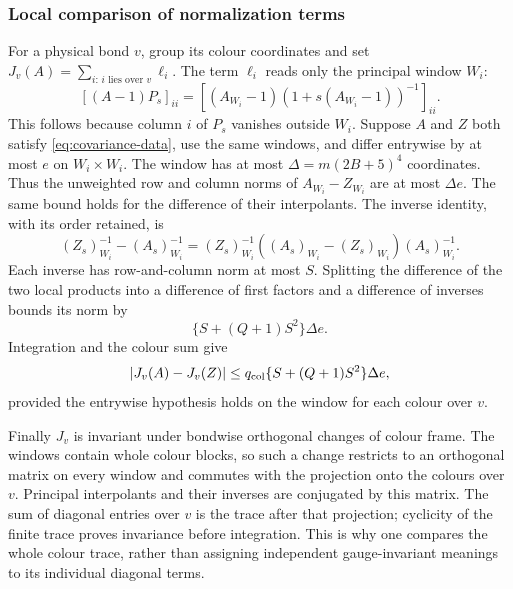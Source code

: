 \subsubsection{Local comparison of normalization terms}
For a physical bond $v$, group its colour coordinates and set
$J_v(A)=\sum_{i:\,i\text{ lies over }v}\ell_i$.
The term $\ell_i$ reads only the principal window $W_i$:
\[
 [(A-1)P_s]_{ii}
 =[(A_{W_i}-1)(1+s(A_{W_i}-1))^{-1}]_{ii}.
\]
This follows because column $i$ of $P_s$ vanishes outside $W_i$.
Suppose $A$ and $Z$ both satisfy \eqref{eq:covariance-data},
use the same windows, and differ entrywise by at most $e$ on
$W_i\times W_i$. The window has at most
$\Delta=m(2B+5)^4$ coordinates. Thus the unweighted row and
column norms of $A_{W_i}-Z_{W_i}$ are at most $\Delta e$.
The same bound holds for the difference of their interpolants.
The inverse identity, with its order retained, is
\[
 (Z_s)_{W_i}^{-1}-(A_s)_{W_i}^{-1}
 =(Z_s)_{W_i}^{-1}
       ((A_s)_{W_i}-(Z_s)_{W_i})(A_s)_{W_i}^{-1}.
\]
Each inverse has row-and-column norm at most $S$. Splitting
the difference of the two local products into a difference of
first factors and a difference of inverses bounds its norm by
\[
 \{S+(Q+1)S^2\}\Delta e.
\]
Integration and the colour sum give
\begin{equation}\label{eq:local-log-comparison}
 |J_v(A)-J_v(Z)|
 \le q_{\rm col}\{S+(Q+1)S^2\}\Delta e,
\end{equation}
provided the entrywise hypothesis holds on the window for each
colour over $v$.

Finally $J_v$ is invariant under bondwise orthogonal changes of
colour frame. The windows contain whole colour blocks, so such
a change restricts to an orthogonal matrix on every window and
commutes with the projection onto the colours over $v$.
Principal interpolants and their inverses are conjugated by this
matrix. The sum of diagonal entries over $v$ is the trace after
that projection; cyclicity of the finite trace proves invariance
before integration. This is why one compares the whole colour
trace, rather than assigning independent gauge-invariant meanings
to its individual diagonal terms.
